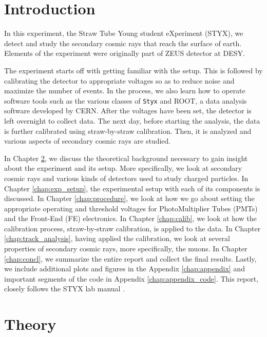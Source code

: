 \documentclass[a4paper]{report}
\numberwithin{equation}{section}
\begin{document}
\tableofcontents

\chapter{Introduction} \label{chap:intro}

In this experiment, the Straw Tube Young student eXperiment (STYX), we detect and study the secondary cosmic rays that reach the surface of earth. Elements of the experiment were originally part of ZEUS detector at DESY. 

The experiment starts off with getting familiar with the setup. This is followed by calibrating the detector to appropriate voltages so as to reduce noise and maximize the number of events. In the process, we also learn how to operate software tools such as the various classes of \texttt{Styx} and ROOT, a data analysis software developed by CERN. After the voltages have been set, the detector is left overnight to collect data. The next day, before starting the analysis, the data is further calibrated using straw-by-straw calibration. Then, it is analyzed and various aspects of secondary cosmic rays are studied. 

In Chapter \ref{chap:theory}, we discuss the theoretical background necessary to gain insight about the experiment and its setup. More specifically, we look at secondary cosmic rays and various kinds of detectors used to study charged particles. In Chapter \ref{chap:exp_setup}, the experimental setup with each of its components is discussed. In Chapter \ref{chap:procedure}, we look at how we go about setting the appropriate operating and threshold voltages for PhotoMultiplier Tubes (PMTs) and the Front-End (FE) electronics. In Chapter \ref{chap:calib}, we look at how the calibration process, straw-by-straw calibration, is applied to the data. In Chapter \ref{chap:track_analysis}, having applied the calibration, we look at several properties of secondary cosmic rays, more specifically, the muons. In Chapter \ref{chap:concl}, we summarize the entire report and collect the final results. Lastly, we include additional plots and figures in the Appendix \ref{chap:appendix} and important segments of the code in Appendix \ref{chap:appendix_code}. This report, closely follows the STYX lab manual \cite{labman}.

\chapter{Theory} \label{chap:theory}
\end{document}
